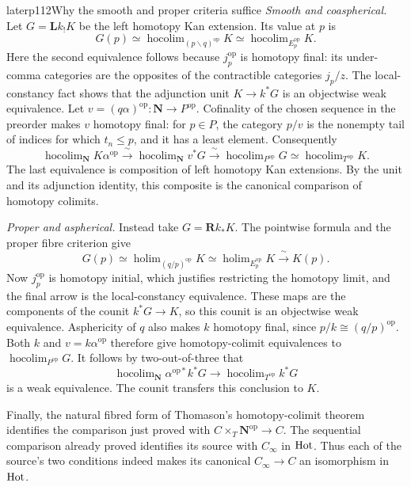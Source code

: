 \begin{dcomment}{later}{p112}{Why the smooth and proper criteria suffice}
\emph{Smooth and coaspherical.} Let $G=\mathbf Lk_!K$ be the left homotopy Kan extension. Its value at $p$ is
\[
 G(p)\simeq
 \operatorname{hocolim}_{(p\backslash q)^{\mathrm{op}}}K
 \simeq\operatorname{hocolim}_{E_p^{\mathrm{op}}}K.
\]
Here the second equivalence follows because $j_p^{\mathrm{op}}$ is homotopy final: its under-comma categories are the opposites of the contractible categories $j_p/z$. The local-constancy fact shows that the adjunction unit $K\to k^*G$ is an objectwise weak equivalence. Let $v=(q\alpha)^{\mathrm{op}}:\mathbf N\to P^{\mathrm{op}}$. Cofinality of the chosen sequence in the preorder makes $v$ homotopy final: for $p\in P$, the category $p/v$ is the nonempty tail of indices for which $t_n\le p$, and it has a least element. Consequently
\[
 \operatorname{hocolim}_{\mathbf N}K\alpha^{\mathrm{op}}
 \xrightarrow{\ \sim\ }
 \operatorname{hocolim}_{\mathbf N}v^*G
 \xrightarrow{\ \sim\ }
 \operatorname{hocolim}_{P^{\mathrm{op}}}G
 \simeq\operatorname{hocolim}_{T^{\mathrm{op}}}K.
\]
The last equivalence is composition of left homotopy Kan extensions. By the unit and its adjunction identity, this composite is the canonical comparison of homotopy colimits.

\emph{Proper and aspherical.} Instead take $G=\mathbf Rk_*K$. The pointwise formula and the proper fibre criterion give
\[
 G(p)\simeq
 \operatorname{holim}_{(q/p)^{\mathrm{op}}}K
 \simeq\operatorname{holim}_{E_p^{\mathrm{op}}}K
 \xrightarrow{\ \sim\ }K(p).
\]
Now $j_p^{\mathrm{op}}$ is homotopy initial, which justifies restricting the homotopy limit, and the final arrow is the local-constancy equivalence. These maps are the components of the counit $k^*G\to K$, so this counit is an objectwise weak equivalence. Asphericity of $q$ also makes $k$ homotopy final, since $p/k\cong(q/p)^{\mathrm{op}}$. Both $k$ and $v=k\alpha^{\mathrm{op}}$ therefore give homotopy-colimit equivalences to $\operatorname{hocolim}_{P^{\mathrm{op}}}G$. It follows by two-out-of-three that
\[
 \operatorname{hocolim}_{\mathbf N}\alpha^{\mathrm{op}*}k^*G
 \longrightarrow\operatorname{hocolim}_{T^{\mathrm{op}}}k^*G
\]
is a weak equivalence. The counit transfers this conclusion to $K$.

Finally, the natural fibred form of Thomason's homotopy-colimit theorem identifies the comparison just proved with $C\times_T\mathbf N^{\mathrm{op}}\to C$. The sequential comparison already proved identifies its source with $C_\infty$ in $\mathrm{Hot}$. Thus each of the source's two conditions indeed makes its canonical $C_\infty\to C$ an isomorphism in $\mathrm{Hot}$.


\end{dcomment}
